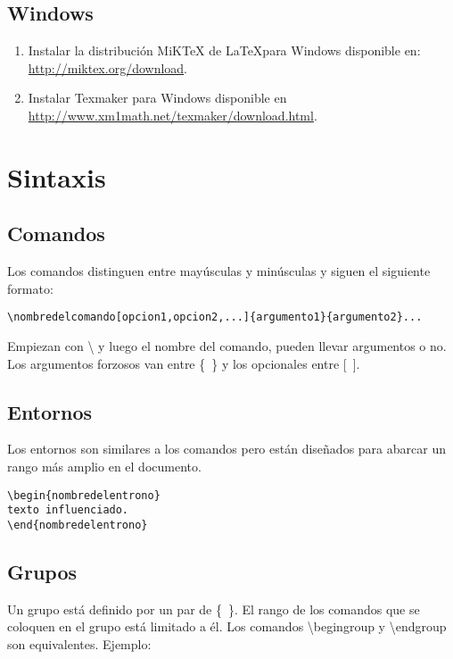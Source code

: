 \documentclass[12pt, a4paper,twoside]{article} %
\begin{document}
\subsection{Windows}
\begin{enumerate}
\item Instalar la distribución MiKTeX de \LaTeX para Windows disponible en: \url{http://miktex.org/download}.
\item Instalar Texmaker para Windows disponible en \url{http://www.xm1math.net/texmaker/download.html}.
\end{enumerate}

\section{Sintaxis}

\subsection{Comandos}

Los comandos distinguen entre mayúsculas y minúsculas y siguen el siguiente formato: 

\begin{center}
\lstinline!\nombredelcomando[opcion1,opcion2,...]{argumento1}{argumento2}...!
\end{center}

Empiezan con \textbackslash{} y luego el nombre del comando, pueden llevar argumentos o no. Los argumentos forzosos van entre \{~\} y los opcionales entre [~].

\subsection{Entornos}

Los entornos son similares a los comandos pero están diseñados para abarcar un rango más amplio en el documento.

\begin{lstlisting}
\begin{nombredelentrono}
texto influenciado.
\end{nombredelentrono}
\end{lstlisting}

\subsection{Grupos}

Un grupo está definido por un par de \{~\}. El rango de los comandos que se coloquen en el grupo está limitado a él. Los comandos \textbackslash{}begingroup y \textbackslash{}endgroup son equivalentes. Ejemplo:
\end{document}
